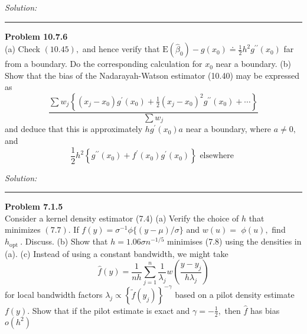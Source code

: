 \documentclass[a4paper, 11pt]{article}
\newenvironment{problem}[2][Problem]
    { \begin{mdframed}[backgroundcolor=gray!20] \textbf{#1 #2} \\}
    {  \end{mdframed}}
\newenvironment{solution}
    {\textit{Solution:}}
    {}
\begin{document}
\begin{solution}



\end{solution}

\noindent\rule{7in}{2.8pt}

\begin{problem}{10.7.6}
 
 (a) Check $(10.45),$ and hence verify that $\mathrm{E}\left(\widehat{\beta}_{0}\right)-g\left(x_{0}\right) \doteq \frac{1}{2} h^{2} g^{\prime \prime}\left(x_{0}\right)$ far from a boundary. Do the corresponding calculation for $x_{0}$ near a boundary.
(b) Show that the bias of the Nadarayah-Watson estimator (10.40) may be expressed as
\[
\frac{\sum w_{j}\left\{\left(x_{j}-x_{0}\right) g^{\prime}\left(x_{0}\right)+\frac{1}{2}\left(x_{j}-x_{0}\right)^{2} g^{\prime \prime}\left(x_{0}\right)+\cdots\right\}}{\sum w_{j}}
\]
and deduce that this is approximately $h g^{\prime}\left(x_{0}\right) a$ near a boundary, where $a \neq 0,$ and
\[
\frac{1}{2} h^{2}\left\{g^{\prime \prime}\left(x_{0}\right)+f^{\prime}\left(x_{0}\right) g^{\prime}\left(x_{0}\right)\right\} \text { elsewhere }
\]
\end{problem}

\begin{solution}



\end{solution}

\noindent\rule{7in}{2.8pt}

\begin{problem}{7.1.5}
 
 Consider a kernel density estimator (7.4)
(a) Verify the choice of $h$ that minimizes $(7.7) .$ If $f(y)=\sigma^{-1} \phi\{(y-\mu) / \sigma\}$ and $w(u)=$
$\phi(u),$ find $h_{\text {opt }} .$ Discuss.
(b) Show that $h=1.06 \sigma n^{-1 / 5}$ minimises (7.8) using the densities in (a).
(c) Instead of using a constant bandwidth, we might take
\[
\widehat{f}(y)=\frac{1}{n h} \sum_{j=1}^{n} \frac{1}{\lambda_{j}} w\left(\frac{y-y_{j}}{h \lambda_{j}}\right)
\]
for local bandwidth factors $\lambda_{j} \propto\left\{\tilde{f}\left(y_{j}\right)\right\}^{-\gamma}$ based on a pilot density estimate $f(y) .$ Show that if the pilot estimate is exact and $\gamma=-\frac{1}{2},$ then $\hat{f}$ has bias $o\left(h^{2}\right)$
 
\end{problem}
\end{document}
